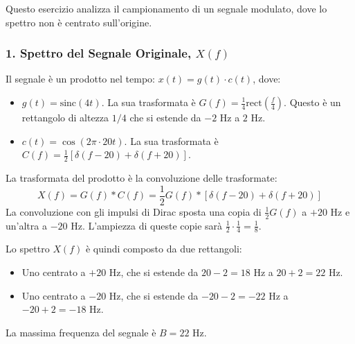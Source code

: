 
\begin{soluzione}{10}
    Questo esercizio analizza il campionamento di un segnale modulato, dove lo spettro non è centrato sull'origine.

    \subsubsection*{1. Spettro del Segnale Originale, $X(f)$}
    Il segnale è un prodotto nel tempo: $x(t) = g(t) \cdot c(t)$, dove:
    \begin{itemize}
        \item $g(t) = \text{sinc}(4t)$. La sua trasformata è $G(f) = \frac{1}{4}\text{rect}\left(\frac{f}{4}\right)$. Questo è un rettangolo di altezza $1/4$ che si estende da $-2$ Hz a $2$ Hz.
        \item $c(t) = \cos(2\pi \cdot 20t)$. La sua trasformata è $C(f) = \frac{1}{2}[\delta(f-20) + \delta(f+20)]$.
    \end{itemize}
    La trasformata del prodotto è la convoluzione delle trasformate:
    \[
        X(f) = G(f) * C(f) = \frac{1}{2}G(f) * [\delta(f-20) + \delta(f+20)]
    \]
    La convoluzione con gli impulsi di Dirac sposta una copia di $\frac{1}{2}G(f)$ a $+20$ Hz e un'altra a $-20$ Hz. L'ampiezza di queste copie sarà $\frac{1}{2} \cdot \frac{1}{4} = \frac{1}{8}$.
    
    Lo spettro $X(f)$ è quindi composto da due rettangoli:
    \begin{itemize}
        \item Uno centrato a $+20$ Hz, che si estende da $20-2=18$ Hz a $20+2=22$ Hz.
        \item Uno centrato a $-20$ Hz, che si estende da $-20-2=-22$ Hz a $-20+2=-18$ Hz.
    \end{itemize}
    La massima frequenza del segnale è $B = 22$ Hz.

    \begin{center}
    \end{center}


\end{soluzione}
